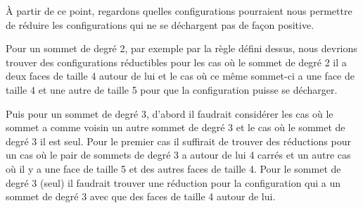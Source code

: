 \documentclass[10pt,a4paper]{article}
\begin{document}
%
%
%
%
%


À partir de ce point, regardons quelles configurations pourraient nous permettre de réduire les configurations qui ne se déchargent pas de façon positive.

Pour un sommet de degré 2, par exemple par la règle défini dessus, nous devrions trouver des configurations réductibles pour les cas où le sommet de degré 2 il a deux faces de taille 4 autour de lui et le cas où ce même sommet-ci a une face de taille 4 et une autre de taille 5 pour que la configuration puisse se décharger. 

Puis pour un sommet de degré 3, d'abord il faudrait considérer les cas où le sommet a comme voisin un autre sommet de degré 3 et le cas où le sommet de degré 3 il est seul. Pour le premier cas il suffirait de trouver des réductions pour un cas où le pair de sommets de degré 3 a autour de lui 4 carrés et un autre cas où il y a une face de taille 5 et des autres faces de taille 4. Pour le sommet de degré 3 (seul) il faudrait trouver une réduction pour la configuration qui a un sommet de degré 3 avec que des faces de taille 4 autour de lui.
\end{document}
